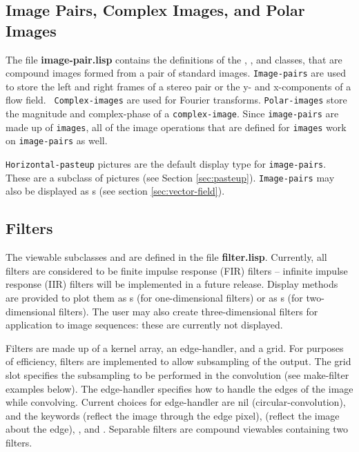 \subsection{Image Pairs, Complex Images, and Polar Images}
\label{sec:image-pair}

The file {\bf image-pair.lisp} contains the definitions of the
, , and 
classes, that are compound images formed from a pair of standard
images.  {\tt Image-pairs} are used to store the left and right frames
of a stereo pair or the y- and x-components of a flow field.  {\tt
Complex-images} are used for Fourier transforms.  {\tt Polar-images}
store the magnitude and complex-phase of a {\tt complex-image}.  Since
{\tt image-pairs} are made up of {\tt images}, all of the image
operations that are defined for {\tt images} work on {\tt image-pairs}
as well.

{\tt Horizontal-pasteup} pictures are the default display type for
{\tt image-pairs}.  These are a subclass of  pictures
(see Section \ref{sec:pasteup}).  {\tt Image-pairs} may also be
displayed as s (see section \ref{sec:vector-field}).


\subsection{Filters}
\label{sec:filters}

The viewable subclasses  and  are
defined in the file {\bf filter.lisp}.  Currently, all filters are
considered to be finite impulse response (FIR) filters -- infinite
impulse response (IIR) filters will be implemented in a future
release.  Display methods are provided to plot them as s
(for one-dimensional filters) or as s (for two-dimensional
filters).  The user may also create three-dimensional filters for
application to image sequences: these are currently not displayed.

Filters are made up of a kernel array, an edge-handler, and a grid.
For purposes of efficiency, filters are implemented to allow
subsampling of the output.  The grid slot specifies the subsampling to
be performed in the convolution (see make-filter examples below).  The
edge-handler specifies how to handle the edges of the image while
convolving.  Current choices for edge-handler are nil
(circular-convolution), and the keywords  (reflect the
image through the edge pixel),
 (reflect the image about the edge), , and
.  Separable filters are compound viewables 
containing two filters.

